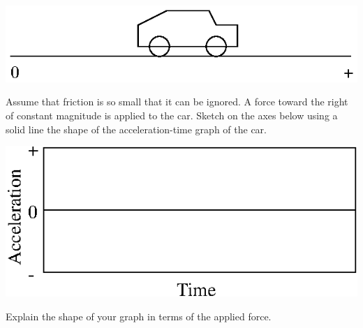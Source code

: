 \vspace{0.3cm}
{\par\centering \includegraphics{force2_fig6.eps} \par}
\vspace{0.3cm}

Assume that friction is so small that it can be ignored. A force toward the
right of constant magnitude is applied to the car. Sketch on the axes below
using a solid line the shape of the acceleration-time graph of the car.

\vspace{0.3cm}
{\par\centering \includegraphics{force2_fig10.eps} \par}
\vspace{0.3cm}

Explain the shape of your graph in terms of the applied force.

